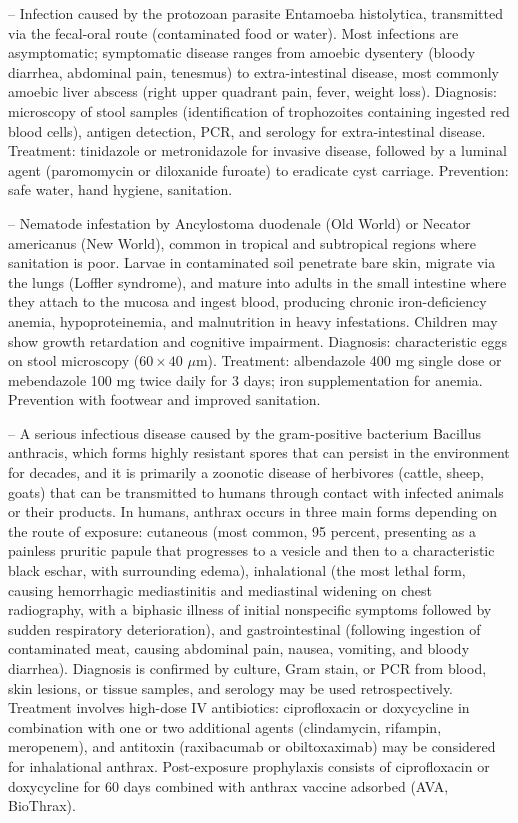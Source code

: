 -- Infection caused by the protozoan parasite Entamoeba histolytica, transmitted via the fecal-oral route (contaminated food or water). Most infections are asymptomatic; symptomatic disease ranges from amoebic dysentery (bloody diarrhea, abdominal pain, tenesmus) to extra-intestinal disease, most commonly amoebic liver abscess (right upper quadrant pain, fever, weight loss). Diagnosis: microscopy of stool samples (identification of trophozoites containing ingested red blood cells), antigen detection, PCR, and serology for extra-intestinal disease. Treatment: tinidazole or metronidazole for invasive disease, followed by a luminal agent (paromomycin or diloxanide furoate) to eradicate cyst carriage. Prevention: safe water, hand hygiene, sanitation.

-- Nematode infestation by Ancylostoma duodenale (Old World) or Necator americanus (New World), common in tropical and subtropical regions where sanitation is poor. Larvae in contaminated soil penetrate bare skin, migrate via the lungs (Loffler syndrome), and mature into adults in the small intestine where they attach to the mucosa and ingest blood, producing chronic iron-deficiency anemia, hypoproteinemia, and malnutrition in heavy infestations. Children may show growth retardation and cognitive impairment. Diagnosis: characteristic eggs on stool microscopy ($60 \times 40$ $\mu$m). Treatment: albendazole 400 mg single dose or mebendazole 100 mg twice daily for 3 days; iron supplementation for anemia. Prevention with footwear and improved sanitation.

-- A serious infectious disease caused by the gram-positive bacterium Bacillus anthracis, which forms highly resistant spores that can persist in the environment for decades, and it is primarily a zoonotic disease of herbivores (cattle, sheep, goats) that can be transmitted to humans through contact with infected animals or their products. In humans, anthrax occurs in three main forms depending on the route of exposure: cutaneous (most common, 95 percent, presenting as a painless pruritic papule that progresses to a vesicle and then to a characteristic black eschar, with surrounding edema), inhalational (the most lethal form, causing hemorrhagic mediastinitis and mediastinal widening on chest radiography, with a biphasic illness of initial nonspecific symptoms followed by sudden respiratory deterioration), and gastrointestinal (following ingestion of contaminated meat, causing abdominal pain, nausea, vomiting, and bloody diarrhea). Diagnosis is confirmed by culture, Gram stain, or PCR from blood, skin lesions, or tissue samples, and serology may be used retrospectively. Treatment involves high-dose IV antibiotics: ciprofloxacin or doxycycline in combination with one or two additional agents (clindamycin, rifampin, meropenem), and antitoxin (raxibacumab or obiltoxaximab) may be considered for inhalational anthrax. Post-exposure prophylaxis consists of ciprofloxacin or doxycycline for 60 days combined with anthrax vaccine adsorbed (AVA, BioThrax).

